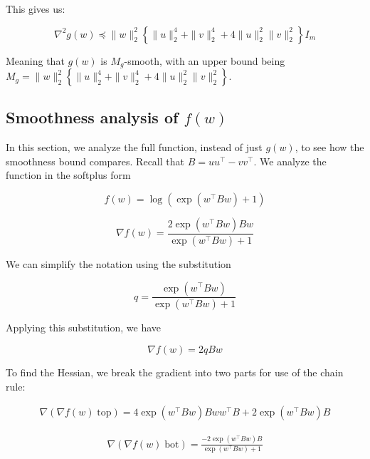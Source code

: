 \documentclass[11pt]{article}
\begin{document}
This gives us:

\begin{equation}
    \nabla^2 g(w) \preceq \|w\|_2^2 \left\{ \|u\|_2^4 + \|v\|_2^4 + 4 \|u\|_2^2 \|v\|_2^2 \right\} I_m
\end{equation}

Meaning that $g(w)$ is $M_g$-smooth, with an upper bound being $M_g = \|w\|_2^2 \left\{ \|u\|_2^4 + \|v\|_2^4 + 4 \|u\|_2^2 \|v\|_2^2 \right\}$.

\subsection{Smoothness analysis of $f(w)$}

In this section, we analyze the full function, instead of just $g(w)$, to see how the smoothness bound compares. Recall that $B = uu^\top - vv^\top$. We analyze the function in the softplus form

\begin{equation}
\label{eq:f}
    f(w) = \log(\exp(w^{\top}Bw) + 1)
\end{equation}

\begin{equation}
    \nabla f(w) = \frac{2 \exp(w^{\top}Bw)Bw}{\exp(w^{\top}Bw) + 1}
\end{equation}

We can simplify the notation using the substitution

\begin{equation}
q = \frac{\exp(w^{\top}Bw)}{\exp(w^{\top}Bw) + 1}
\end{equation}

Applying this substitution, we have

\begin{equation}
\label{eq:grad_f}
    \nabla f(w) = 2qBw
\end{equation}

To find the Hessian, we break the gradient into two parts for use of the chain rule:

\begin{align*}
    \nabla (\nabla f(w) \; \textrm{top}) = 4 \exp(w^{\top}Bw)Bww^{\top}B  + 2 \exp(w^{\top}Bw)B
\end{align*}

\begin{align*}
    \nabla (\nabla f(w) \; \textrm{bot}) = \frac{-2 \exp(w^{\top}Bw)B}{\exp(w^{\top}Bw) + 1}
\end{align*}
\end{document}
